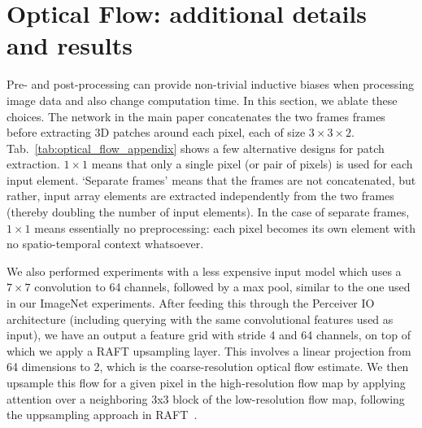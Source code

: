 \documentclass{article} %
\newcommand{\ourmodel}{Perceiver IO\xspace}
\begin{document}
\section{Optical Flow: additional details and results}
\label{sec:flow_appendix}

Pre- and post-processing can provide non-trivial inductive biases when processing image data and also change computation time.  In this section, we ablate these choices.  The network in the main paper concatenates the two frames frames before extracting 3D patches around each pixel, each of size $3{\times}3{\times}2$.  Tab.~\ref{tab:optical_flow_appendix} shows a few alternative designs for patch extraction.  $1{\times}1$ means that only a single pixel (or pair of pixels) is used for each input element.  `Separate frames' means that the frames are not concatenated, but rather, input array elements are extracted independently from the two frames (thereby doubling the number of input elements).  In the case of separate frames, $1{\times}1$ means essentially no preprocessing: each pixel becomes its own element with no spatio-temporal context whatsoever.

We also performed experiments with a less expensive input model which uses a $7{\times}7$ convolution to 64 channels, followed by a max pool, similar to the one used in our ImageNet experiments.  After feeding this through the \ourmodel{} architecture (including querying with the same convolutional features used as input), we have an output a feature grid with stride 4 and 64 channels, on top of which we apply a RAFT upsampling layer.  This involves a linear projection from 64 dimensions to 2, which is the coarse-resolution optical flow estimate.  We then upsample this flow for a given pixel in the high-resolution flow map by applying attention over a neighboring 3x3 block of the low-resolution flow map, following the uppsampling approach in RAFT~\citep{teed2020raft}. 
\end{document}
